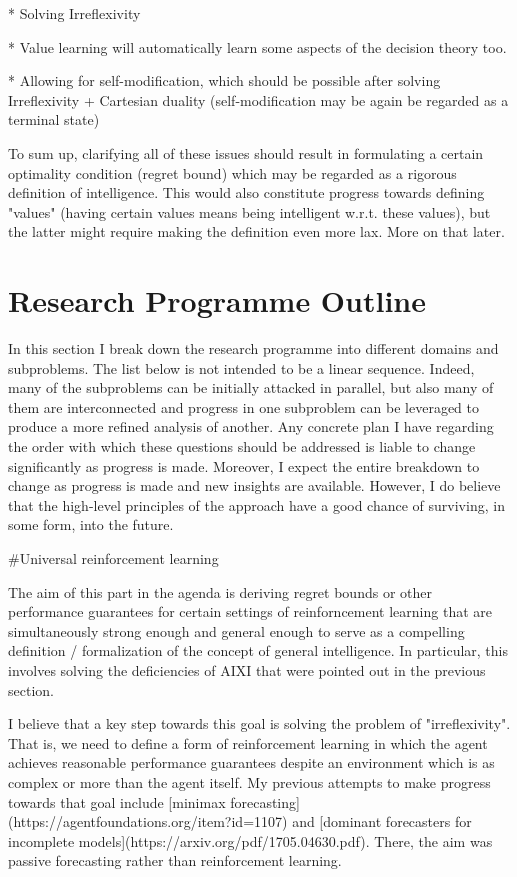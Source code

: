 \documentclass[a4paper]{article}
\begin{document}
* Solving Irreflexivity

* Value learning will automatically learn some aspects of the decision theory too.

* Allowing for self-modification, which should be possible after solving Irreflexivity + Cartesian duality (self-modification may be again be regarded as a terminal state)

To sum up, clarifying all of these issues should result in formulating a certain optimality condition (regret bound) which may be regarded as a rigorous definition of intelligence. This would also constitute progress towards defining "values" (having certain values means being intelligent w.r.t. these values), but the latter might require making the definition even more lax. More on that later.

\section{Research Programme Outline}

In this section I break down the research programme into different domains and subproblems. The list below is not intended to be a linear sequence. Indeed, many of the subproblems can be initially attacked in parallel, but also many of them are interconnected and progress in one subproblem can be leveraged to produce a more refined analysis of another. Any concrete plan I have regarding the order with which these questions should be addressed is liable to change significantly as progress is made. Moreover, I expect the entire breakdown to change as progress is made and new insights are available. However, I do believe that the high-level principles of the approach have a good chance of surviving, in some form, into the future.

\#Universal reinforcement learning

The aim of this part in the agenda is deriving regret bounds or other performance guarantees for certain settings of reinforncement learning that are simultaneously strong enough and general enough to serve as a compelling definition / formalization of the concept of general intelligence. In particular, this involves solving the deficiencies of AIXI that were pointed out in the previous section.

I believe that a key step towards this goal is solving the problem of "irreflexivity". That is, we need to define a form of reinforcement learning in which the agent achieves reasonable performance guarantees despite an environment which is as complex or more than the agent itself. My previous attempts to make progress towards that goal include [minimax forecasting](https://agentfoundations.org/item?id=1107) and [dominant forecasters for incomplete models](https://arxiv.org/pdf/1705.04630.pdf). There, the aim was passive forecasting rather than reinforcement learning.
\end{document}
